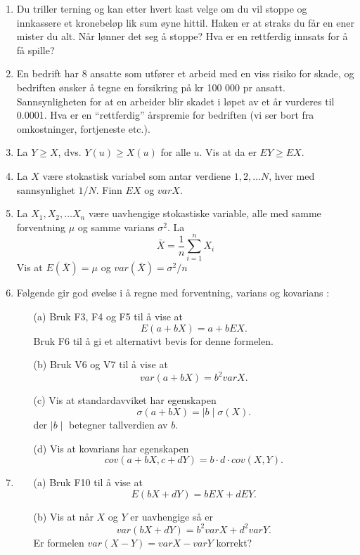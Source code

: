 \begin{enumerate}
\item Du triller terning og kan etter hvert kast velge om du vil stoppe og
      innkassere et kronebeløp lik sum øyne hittil. Haken er at straks du
      får en ener mister du alt. Når lønner det seg å stoppe?
      Hva er en rettferdig innsats for å få spille?


\item En bedrift har 8 ansatte som utfører et arbeid med en viss
     risiko for skade, og bedriften ønsker å tegne en forsikring
     på kr 100 000 pr ansatt. Sannsynligheten for at en arbeider
     blir skadet i løpet av et år vurderes til 0.0001. Hva er en
     ``rettferdig'' årspremie for bedriften (vi ser bort fra
     omkostninger, fortjeneste etc.).

\item La $Y\geq X$, dvs. $Y(u)\geq X(u)$ for alle $u$. Vis at da
     er $EY\geq EX$.

\item La $X$ være stokastisk variabel som antar verdiene $1, 2,\ldots N$,
      hver med sannsynlighet $1/N$. Finn $EX$ og $varX$.

\item La $X_1, X_2, \ldots X_n$ være uavhengige stokastiske
     variable, alle med samme forventning $\mu$ og samme varians
     ${\sigma}^2$. La
     \[ \bar{X}=\frac{1}{n} \sum_{i=1}^{n} X_i \]
      Vis at $E(\bar{X})=\mu $ og $var(\bar{X})={\sigma}^2/n$

\item Følgende gir god øvelse i å regne med forventning, varians
      og kovarians :
      \begin{itemize}
       \item[(a)]  Bruk F3, F4 og F5 til å vise at
          \[ E(a+bX)=a+bEX. \]
          Bruk F6 til å gi et alternativt bevis for denne formelen.
       \item[(b)]  Bruk V6 og V7 til å vise at
           \[ var(a+bX)=b^2varX. \]
       \item[(c)]  Vis at standardavviket har egenskapen
          \[ \sigma (a+bX)=\mid b\mid \sigma (X). \]
          der $\mid b\mid$ betegner tallverdien av $b$.
       \item[(d)]  Vis at kovarians har egenskapen
          \[ cov(a+bX, c+dY)=b\cdot d \cdot cov(X,Y). \]
     \end{itemize}

\item \begin{itemize}
       \item[(a)]  Bruk F10 til å vise at
          \[ E(bX+dY)=bEX+dEY. \]
       \item[(b)]  Vis at når $X$ og $Y$ er uavhengige så er
          \[ var(bX+dY)=b^2varX+d^2varY. \]
          Er formelen $var(X-Y)=varX-varY$ korrekt?
     \end{itemize}


\end{enumerate}
